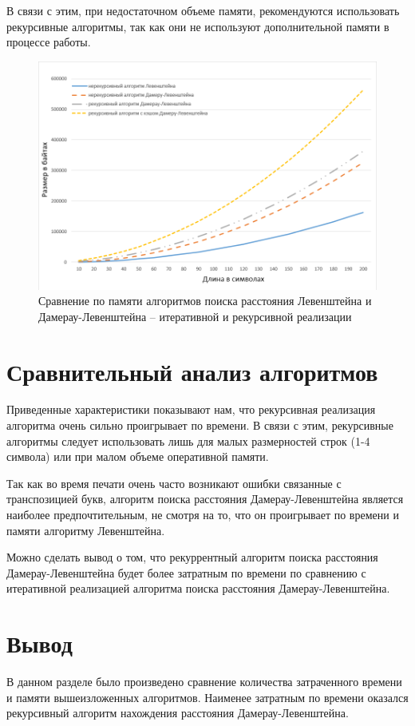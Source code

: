 \documentclass[a4paper,14pt, unknownkeysallowed]{bmstu}
\begin{document}
В связи с этим, при недостаточном объеме памяти, рекомендуются использовать рекурсивные алгоритмы, так как они не используют дополнительной памяти в процессе работы.

\clearpage

\begin{figure}[h]
	\centering
	\includegraphics[height=0.3\textheight]{img/diag_03.png}
	\caption{Сравнение по памяти алгоритмов поиска расстояния Левенштейна и Дамерау-Левенштейна -- итеративной и рекурсивной реализации}
	\label{plt:memory}
\end{figure}

\section{Сравнительный анализ алгоритмов}
Приведенные характеристики показывают нам, что рекурсивная реализация алгоритма очень сильно проигрывает по времени. В связи с этим, рекурсивные алгоритмы следует использовать лишь для малых размерностей строк (1-4 символа) или при малом объеме оперативной памяти.

Так как во время печати очень часто возникают ошибки связанные с транспозицией букв, алгоритм поиска расстояния Дамерау-Левенштейна является наиболее предпочтительным, не смотря на то, что он проигрывает по времени и памяти алгоритму Левенштейна.

Можно сделать вывод о том, что рекуррентный алгоритм поиска расстояния Дамерау-Левенштейна будет более затратным по времени по сравнению с итеративной реализацией алгоритма поиска расстояния Дамерау-Левенштейна.

\section{Вывод}
В данном разделе было произведено сравнение количества затраченного времени и памяти вышеизложенных алгоритмов. Наименее затратным по времени оказался рекурсивный алгоритм нахождения расстояния Дамерау-Левенштейна.
\end{document}
